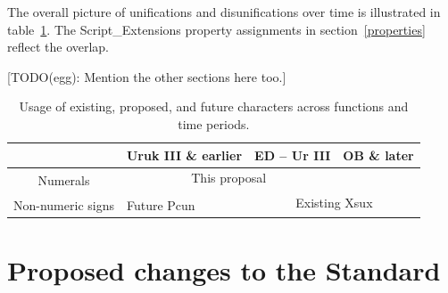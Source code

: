 \documentclass[10pt, a4paper, twoside]{article}
\begin{document}
The overall picture of unifications and disunifications over time is illustrated in table~\ref{tableUnificationsDisunifications}.
The Script\_Extensions property assignments in section~\ref{properties} reflect the overlap.

[TODO(egg): Mention the other sections here too.]

\begin{table}[htbp]
\begin{center}
\begin{tabular}{ l | l | l | l |} \cline{2-4}
                                                & Uruk III \& earlier & ED – Ur III                         & OB \& later    \\\hline
\multicolumn{1}{|c|}{\multirow{2}{*}{Numerals}} & \multicolumn{2}{|c|}{This proposal}                       &                \\\cline{2-4}
\multicolumn{1}{|c|}{}                          &                     & \multicolumn{2}{|c|}{\multirow{2}{*}{Existing Xsux}} \\\cline{1-2}
\multicolumn{1}{|c|}{Non-numeric signs}         & Future Pcun         & \multicolumn{2}{|c|}{}                               \\\hline
\end{tabular}
\caption{Usage of existing, proposed, and future characters across functions and time periods.}
\end{center}
\label{tableUnificationsDisunifications}
\end{table}

\section{Proposed changes to the Standard}
\label{proposal}
\end{document}

